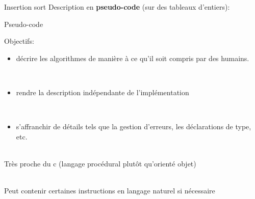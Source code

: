 \begin{frame}{Insertion sort}
Description en {\bf pseudo-code} (sur des tableaux d'entiers):

\bigskip


\end{frame}

\begin{frame}{Pseudo-code}

Objectifs:
\begin{itemize}
\item décrire les algorithmes de manière à ce qu'il soit compris
par des humains.

~\\

\item rendre la description indépendante de l'implémentation

~\\

\item s'affranchir de détails tels que la gestion d'erreurs, les déclarations de type, etc.

\end{itemize}

~\\

Très proche du c (langage procédural plutôt qu'orienté objet)

~\\

Peut contenir certaines instructions en langage naturel si nécessaire

\end{frame}


